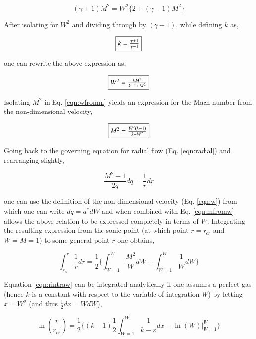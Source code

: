 \begin{displaymath}
	(\gamma+1)M^2 = W^2\Big\{2+(\gamma-1)M^2\Big\}
\end{displaymath}

	After isolating for $W^2$ and dividing through by $(\gamma -1)$, while defining $k$ as,

\begin{equation}
	\fbox{$
	k = \frac{\gamma+1}{\gamma-1}
	$}
\label{eqn:k}
\end{equation}
	
	one can rewrite the above expression as,

\begin{equation}
	\fbox{$
	W^2 = \frac{kM^2}{k-1 + M^2}
	$}
\label{eqn:wfromm}
\end{equation}

	Isolating $M^2$ in Eq. \ref{eqn:wfromm} yields an expression for the Mach number
from the non-dimensional velocity,

\begin{equation}
	\fbox{$
	M^2 = \frac{W^2(k-1)}{k-W^2}
	$}
\label{eqn:mfromw}
\end{equation}

	Going back to the governing equation for radial flow (Eq. \ref{eqn:radial}) 
and rearranging slightly,

\begin{displaymath}
	\frac{M^2-1}{2q} dq = \frac{1}{r} dr
\end{displaymath}
	
	one can use the definition of the non-dimensional velocity (Eq. \ref{eqn:w}) from which one can write
$dq = a^* dW$ and when combined with Eq. \ref{eqn:mfromw} allows the above relation to be expressed 
completely in terms of $W$.  Integrating the resulting expression from the sonic point (at which 
point $r = r_{cr}$ and $W = M = 1$) to some general point $r$ one obtains,

\begin{equation}
	\int_{r_{cr}}^{r}\frac{1}{r} dr = \frac{1}{2}\Big\{\int_{W=1}^{W}\frac{M^2}{W}dW - 
	\int_{W=1}^{W}\frac{1}{W}dW\Big\}
\label{eqn:rintraw}
\end{equation}

	Equation \ref{eqn:rintraw} can be integrated analytically if one assumes a perfect gas 
(hence $k$ is a constant with respect to the variable of integration $W$) by 
letting $x = W^2$ (and thus $\frac{1}{2}dx = W dW$),

\begin{displaymath}
	\ln(\frac{r}{r_{cr}}) = \frac{1}{2}\Big\{(k-1)\frac{1}{2}\int_{W=1}^{W}\frac{1}{k-x}dx
	- \ln(W)\vert_{W=1}^{W}\Big\}
\end{displaymath}

